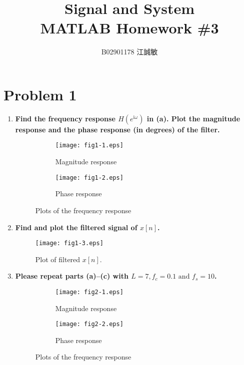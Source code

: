 \documentclass[12pt, a4paper]{article}
\title{ \bf {\Huge Signal and System}\\ MATLAB Homework \#3}
\author{B02901178 江誠敏}
\newcommand{\img}{\mathrm{i}}
\begin{document}
\maketitle

\section{Problem 1}
\begin{enumerate}[label=(\alph*)]
    \addtocounter{enumi}{1}
  \item {\bf Find the frequency response $H(e^{\img\omega})$ in (a). 
      Plot the magnitude response and the phase response (in degrees) of the filter.
    } \\[12pt]

    \begin{figure}[H]
      \centering
      \begin{subfigure}{0.49\textwidth}
        \texttt{[image: fig1-1.eps]}
        \caption{Magnitude response}
      \end{subfigure}%
      \begin{subfigure}{0.49\textwidth}
        \texttt{[image: fig1-2.eps]}
        \caption{Phase response}
      \end{subfigure}
      \caption{Plots of the frequency response}
    \end{figure}

    \clearpage
  \item {\bf Find and plot the filtered signal of $x[n]$.} \\[12pt]

    \begin{figure}[H]
      \centering
      \texttt{[image: fig1-3.eps]}
      \caption{Plot of filtered $x[n]$.}
    \end{figure}


  \item {\bf Please repeat parts (a)--(c) with $L = 7, f_c = 0.1 \text{ and } f_s = 10$.} \\[12pt]
    \begin{figure}[H]
      \centering
      \begin{subfigure}{0.49\textwidth}
        \texttt{[image: fig2-1.eps]}
        \caption{Magnitude response}
      \end{subfigure}%
      \begin{subfigure}{0.49\textwidth}
        \texttt{[image: fig2-2.eps]}
        \caption{Phase response}
      \end{subfigure}
      \caption{Plots of the frequency response}
    \end{figure}


\end{enumerate}
\end{document}
